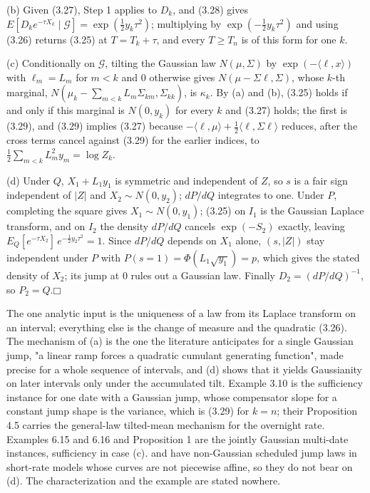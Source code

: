 \documentclass[11pt]{article}
\providecommand{\square}{\mdlgwhtsquare}
\begin{document}
(b) Given (3.27), Step 1 applies to \(D_k\), and (3.28) gives \(E[D_k e^{-\tau X_k} \mid \mathcal G] = \exp(\tfrac12 y_k \tau^2)\); multiplying by \(\exp(-\tfrac12 y_k \tau^2)\) and using (3.26) returns (3.25) at \(T = T_k + \tau\), and every \(T \ge T_n\) is of this form for one \(k\).

(c) Conditionally on \(\mathcal G\), tilting the Gaussian law \(N(\mu, \Sigma)\) by \(\exp(-\langle \ell, x \rangle)\) with \(\ell_m = L_m\) for \(m < k\) and \(0\) otherwise gives \(N(\mu - \Sigma \ell, \Sigma)\), whose \(k\)-th marginal, \(N(\mu_k - \sum_{m<k} L_m \Sigma_{km}, \Sigma_{kk})\), is \(\kappa_k\). By (a) and (b), (3.25) holds if and only if this marginal is \(N(0, y_k)\) for every \(k\) and (3.27) holds; the first is (3.29), and (3.29) implies (3.27) because \(-\langle \ell, \mu \rangle + \tfrac12 \langle \ell, \Sigma \ell \rangle\) reduces, after the cross terms cancel against (3.29) for the earlier indices, to \(\tfrac12 \sum_{m<k} L_m^2 y_m = \log Z_k\).

(d) Under \(Q\), \(X_1 + L_1 y_1\) is symmetric and independent of \(Z\), so \(s\) is a fair sign independent of \(|Z|\) and \(X_2 \sim N(0, y_2)\); \(dP/dQ\) integrates to one. Under \(P\), completing the square gives \(X_1 \sim N(0, y_1)\); (3.25) on \(I_1\) is the Gaussian Laplace transform, and on \(I_2\) the density \(dP/dQ\) cancels \(\exp(-S_2)\) exactly, leaving \(E_Q[e^{-\tau X_2}]\,e^{-\frac12 y_2 \tau^2} = 1\). Since \(dP/dQ\) depends on \(X_1\) alone, \((s, |Z|)\) stay independent under \(P\) with \(P(s = 1) = \Phi(L_1 \sqrt{y_1}) = p\), which gives the stated density of \(X_2\); its jump at \(0\) rules out a Gaussian law. Finally \(D_2 = (dP/dQ)^{-1}\), so \(P_2 = Q\).\hfill$\square$

The one analytic input is the uniqueness of a law from its Laplace transform on an interval; everything else is the change of measure and the quadratic (3.26). The mechanism of (a) is the one the literature anticipates for a single Gaussian jump, "a linear ramp forces a quadratic cumulant generating function", made precise for a whole sequence of intervals, and (d) shows that it yields Gaussianity on later intervals only under the accumulated tilt. \cite{fontana2022term} Example 3.10 is the sufficiency instance for one date with a Gaussian jump, whose compensator slope for a constant jump shape is the variance, which is (3.29) for \(k = n\); their Proposition 4.5 carries the general-law tilted-mean mechanism for the overnight rate. \cite{kellerressel2018affine} Examples 6.15 and 6.16 and \cite{kim2014jumps} Proposition 1 are the jointly Gaussian multi-date instances, sufficiency in case (c). \cite{silva2024discretely} and \cite{calvia2025short} have non-Gaussian scheduled jump laws in short-rate models whose curves are not piecewise affine, so they do not bear on (d). The characterization and the example are stated nowhere.
\end{document}
